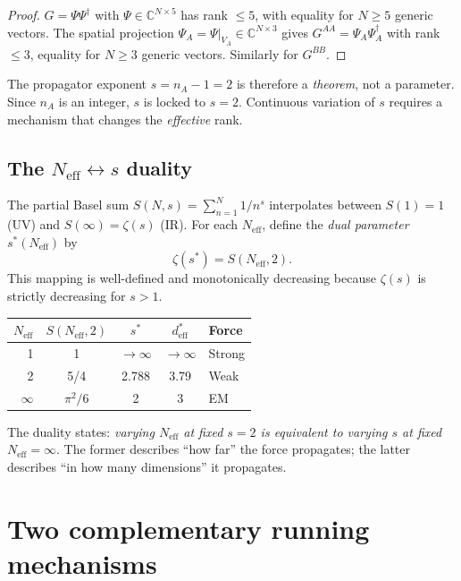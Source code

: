 \documentclass[12pt]{article}
\theoremstyle{definition}
\theoremstyle{remark}
\newcommand{\CC}{\mathbb{C}}
\newcommand{\Neff}{N_{\mathrm{eff}}}
\begin{document}
\begin{proof}
$G = \Psi\Psi^\dagger$ with $\Psi \in \CC^{N \times 5}$
has rank $\leq 5$, with equality for $N \geq 5$ generic vectors.
The spatial projection $\Psi_A = \Psi|_{V_A} \in \CC^{N \times 3}$
gives $G^{AA} = \Psi_A\Psi_A^\dagger$ with rank $\leq 3$,
equality for $N \geq 3$ generic vectors.
Similarly for $G^{BB}$.
\end{proof}

The propagator exponent $s = n_A - 1 = 2$ is therefore
a \emph{theorem}, not a parameter.
Since $n_A$ is an integer, $s$ is locked to $s = 2$.
Continuous variation of $s$ requires a mechanism that
changes the \emph{effective} rank.

\subsection{The $\Neff \leftrightarrow s$ duality}

The partial Basel sum $S(N, s) = \sum_{n=1}^{N} 1/n^s$
interpolates between $S(1) = 1$ (UV) and
$S(\infty) = \zeta(s)$ (IR).
For each $\Neff$, define the \emph{dual parameter}
$s^*(\Neff)$ by
\begin{equation}
  \zeta(s^*) = S(\Neff, 2).
  \label{eq:dual}
\end{equation}
This mapping is well-defined and monotonically
decreasing because $\zeta(s)$ is strictly decreasing
for $s > 1$.

\begin{center}
\begin{tabular}{rcccl}
\toprule
$\Neff$ & $S(\Neff, 2)$ & $s^*$ & $d^*_{\mathrm{eff}}$ & Force \\
\midrule
1 & 1 & $\to\infty$ & $\to\infty$ & Strong \\
2 & 5/4 & 2.788 & 3.79 & Weak \\
$\infty$ & $\pi^2/6$ & 2 & 3 & EM \\
\bottomrule
\end{tabular}
\end{center}

The duality states: \emph{varying $\Neff$ at fixed $s = 2$
is equivalent to varying $s$ at fixed $\Neff = \infty$}.
The former describes ``how far'' the force propagates;
the latter describes ``in how many dimensions'' it propagates.

\section{Two complementary running mechanisms}
\label{sec:mechanisms}
\end{document}
